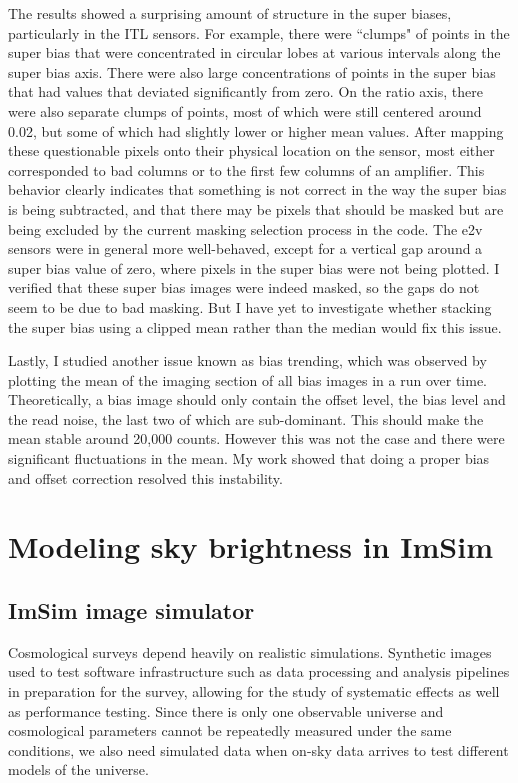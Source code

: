 The results showed a surprising amount of structure in the super biases, particularly in the ITL sensors. For example, there were ``clumps" of points in the super bias that were concentrated in circular lobes at various intervals along the super bias axis. There were also large concentrations of points in the super bias that had values that deviated significantly from zero. On the ratio axis, there were also separate clumps of points, most of which were still centered around 0.02, but some of which had slightly lower or higher mean values. After mapping these questionable pixels onto their physical location on the sensor, most either corresponded to bad columns or to the first few columns of an amplifier. This behavior clearly indicates that something is not correct in the way the super bias is being subtracted, and that there may be pixels that should be masked but are being excluded by the current masking selection process in the  code. The e2v sensors were in general more well-behaved, except for a vertical gap around a super bias value of zero, where pixels in the super bias were not being plotted. I verified that these super bias images were indeed masked, so the gaps do not seem to be due to bad masking. But I have yet to investigate whether stacking the super bias using a clipped mean rather than the median would fix this issue. 

Lastly, I studied another issue known as bias trending, which was observed by plotting the mean of the imaging section of all bias images in a run over time. Theoretically, a bias image should only contain the offset level, the bias level and the read noise, the last two of which are sub-dominant. This should make the mean stable around 20,000 counts. However this was not the case and there were significant fluctuations in the mean. My work showed that doing a proper bias and offset correction resolved this instability.


\section{Modeling sky brightness in ImSim}

\subsection{ImSim image simulator}

Cosmological surveys depend heavily on realistic simulations. Synthetic images used to test software infrastructure such as data processing and analysis pipelines in preparation for the survey, allowing for the study of systematic effects as well as performance testing. Since there is only one observable universe and cosmological parameters cannot be repeatedly measured under the same conditions, we also need simulated data when on-sky data arrives to test different models of the universe.


